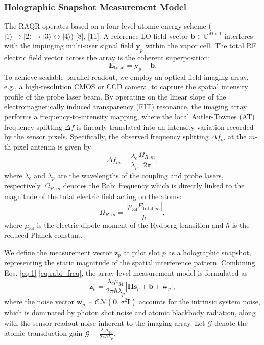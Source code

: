 \documentclass[journal]{IEEEtran}
\begin{document}
\subsubsection{Holographic Snapshot Measurement Model}
The RAQR operates based on a four-level atomic energy scheme ($|1\rangle \to |2\rangle \to |3\rangle \leftrightarrow |4\rangle$) [8], [11]. A reference LO field vector $\mathbf{b} \in \mathbb{C}^{M \times 1}$ interferes with the impinging multi-user signal field $\mathbf{y}_p$ within the vapor cell. The total RF electric field vector across the array is the coherent superposition:
 \begin{equation}
 \mathbf{E}_{\text{total}} = \mathbf{y}_p + \mathbf{b}.
     \label{eq:1}
 \end{equation}
To achieve scalable parallel readout, we employ an optical field imaging array, e.g., a high-resolution CMOS or CCD camera,  to capture the spatial intensity profile of the probe laser beam. 
By operating on the linear slope of the {electromagnetically induced transparency (EIT)} resonance, the imaging array performs a frequency-to-intensity mapping, where the local Autler-Townes (AT) frequency splitting $\Delta f$ is linearly translated into an intensity variation recorded by the sensor pixels. Specifically, the observed frequency splitting $\Delta f_m$ at the $m$-th pixel antenna is given by
\begin{equation}
    \Delta f_m = \frac{\lambda_c}{\lambda_p} \frac{\Omega_{R,m}}{2\pi},
    \label{eq:at_splitting}
\end{equation}
where $\lambda_c$ and $\lambda_p$ are the wavelengths of the coupling and probe lasers, respectively. $\Omega_{R,m}$ denotes the Rabi frequency which is directly linked to the magnitude of the total electric field acting on the atoms:
\begin{equation}
    \Omega_{R,m} = \frac{|\mu_{34} E_{\text{total}, m}|}{\hbar},
    \label{eq:rabi_freq}
\end{equation}
where $\mu_{34}$ is the electric dipole moment of the Rydberg transition and $\hbar$ is the reduced Planck constant.

We define the measurement vector $\mathbf{z}_p$ at pilot slot $p$ as a holographic snapshot, representing the static magnitude of the spatial interference pattern. Combining Eqs. \eqref{eq:1}-\eqref{eq:rabi_freq}, the array-level measurement model is formulated as
\begin{equation}
    \mathbf{z}_p = \frac{\lambda_c \mu_{34}}{2\pi \hbar \lambda_p} \left| \mathbf{H} \mathbf{s}_p + \mathbf{b} + \mathbf{w}_p \right|,
    \label{eq:measurement_vector}
\end{equation}
where the noise vector $\mathbf{w}_p \sim \mathcal{CN}(\mathbf{0}, \sigma^2 \mathbf{I})$ accounts for the intrinsic system noise, which is dominated by photon shot noise and atomic blackbody radiation, along with the sensor readout noise inherent to the imaging array. Let $\mathcal{G}$ denote the atomic transduction gain $\mathcal{G}=\frac{\lambda_c \mu_{34}}{2\pi \hbar \lambda_p}$.
\end{document}
